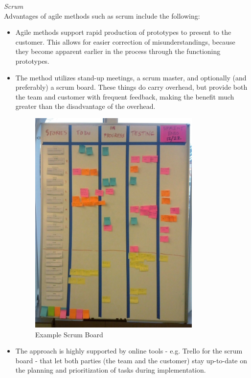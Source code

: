 \emph{Scrum} \\

Advantages of agile methods such as scrum include the following:
	\begin{itemize}
		\item Agile methods support rapid production of prototypes to present to the customer. This allows for easier correction of misunderstandings, because they become apparent earlier in the process through the functioning prototypes.
		\item The method utilizes stand-up meetings, a scrum master, and optionally (and preferably) a scrum board. These things do carry overhead, but provide both the team and customer with frequent feedback, making the benefit much greater than the disadvantage of the overhead.
		
		\begin{figure}[H]
		\centering
		\includegraphics[width=0.8\textwidth]{images/Scrum_task_board.jpg}
		\caption{Example Scrum Board \cite{scrumBoard}}
		\label{fig:scrum_board}
		\end{figure}
		
		\item The approach is highly supported by online tools - e.g. Trello for the scrum board - that let both parties (the team and the customer) stay up-to-date on the planning and prioritization of tasks during implementation.
	\end{itemize}
